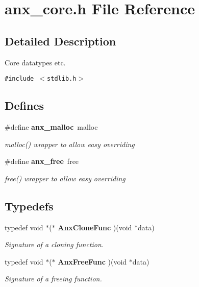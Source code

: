 \section{anx\_\-core.h File Reference}
\label{anx__core_8h}


\subsection{Detailed Description}
Core datatypes etc. 



{\tt \#include $<$stdlib.h$>$}\par
\subsection*{Defines}
\begin{CompactItemize}
\item 
\#define {\bf anx\_\-malloc}\ malloc\label{anx__core_8h_a0}

\begin{CompactList}\small\item\em malloc() wrapper to allow easy overriding \item\end{CompactList}\item 
\#define {\bf anx\_\-free}\ free\label{anx__core_8h_a1}

\begin{CompactList}\small\item\em free() wrapper to allow easy overriding \item\end{CompactList}\end{CompactItemize}
\subsection*{Typedefs}
\begin{CompactItemize}
\item 
typedef void $\ast$($\ast$ {\bf Anx\-Clone\-Func} )(void $\ast$data)\label{anx__core_8h_a2}

\begin{CompactList}\small\item\em Signature of a cloning function. \item\end{CompactList}\item 
typedef void $\ast$($\ast$ {\bf Anx\-Free\-Func} )(void $\ast$data)\label{anx__core_8h_a3}

\begin{CompactList}\small\item\em Signature of a freeing function. \item\end{CompactList}\end{CompactItemize}
